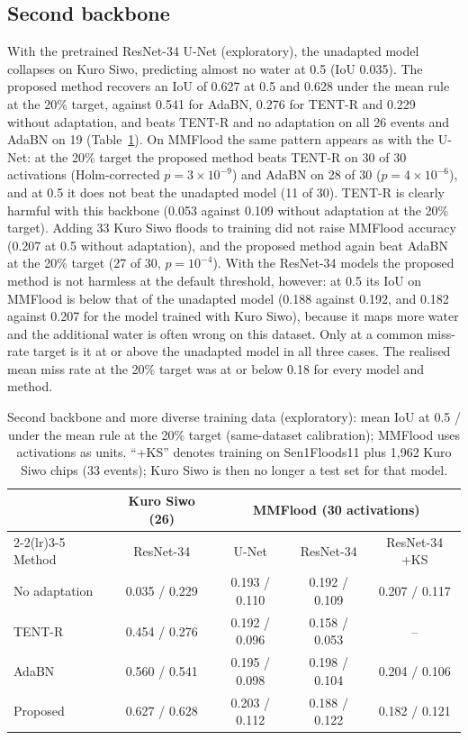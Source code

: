 \documentclass[a4paper,fleqn]{cas-sc}
\begin{document}
\subsection{Second backbone}
With the pretrained ResNet-34 U-Net (exploratory), the unadapted model collapses on Kuro Siwo, predicting almost no water at 0.5 (IoU 0.035). The proposed method recovers an IoU of 0.627 at 0.5 and 0.628 under the mean rule at the 20\% target, against 0.541 for AdaBN, 0.276 for TENT-R and 0.229 without adaptation, and beats TENT-R and no adaptation on all 26 events and AdaBN on 19 (Table~\ref{tab:r34}). On MMFlood the same pattern appears as with the U-Net: at the 20\% target the proposed method beats TENT-R on 30 of 30 activations (Holm-corrected $p=3\times10^{-9}$) and AdaBN on 28 of 30 ($p=4\times10^{-6}$), and at 0.5 it does not beat the unadapted model (11 of 30). TENT-R is clearly harmful with this backbone (0.053 against 0.109 without adaptation at the 20\% target). Adding 33 Kuro Siwo floods to training did not raise MMFlood accuracy (0.207 at 0.5 without adaptation), and the proposed method again beat AdaBN at the 20\% target (27 of 30, $p=10^{-4}$). With the ResNet-34 models the proposed method is not harmless at the default threshold, however: at 0.5 its IoU on MMFlood is below that of the unadapted model (0.188 against 0.192, and 0.182 against 0.207 for the model trained with Kuro Siwo), because it maps more water and the additional water is often wrong on this dataset. Only at a common miss-rate target is it at or above the unadapted model in all three cases. The realised mean miss rate at the 20\% target was at or below 0.18 for every model and method.

\begin{table}[t]
\caption{Second backbone and more diverse training data (exploratory): mean IoU at 0.5 / under the mean rule at the 20\% target (same-dataset calibration); MMFlood uses activations as units. ``+KS'' denotes training on Sen1Floods11 plus 1,962 Kuro Siwo chips (33 events); Kuro Siwo is then no longer a test set for that model.}
\label{tab:r34}
\centering
\begin{tabular}{lcccc}
\toprule
 & Kuro Siwo (26) & \multicolumn{3}{c}{MMFlood (30 activations)} \\
\cmidrule(lr){2-2}\cmidrule(lr){3-5}
Method & ResNet-34 & U-Net & ResNet-34 & ResNet-34 +KS \\
\midrule
No adaptation & 0.035 / 0.229 & 0.193 / 0.110 & 0.192 / 0.109 & 0.207 / 0.117 \\
TENT-R & 0.454 / 0.276 & 0.192 / 0.096 & 0.158 / 0.053 & -- \\
AdaBN & 0.560 / 0.541 & 0.195 / 0.098 & 0.198 / 0.104 & 0.204 / 0.106 \\
Proposed & 0.627 / 0.628 & 0.203 / 0.112 & 0.188 / 0.122 & 0.182 / 0.121 \\
\bottomrule
\end{tabular}
\end{table}
\end{document}
